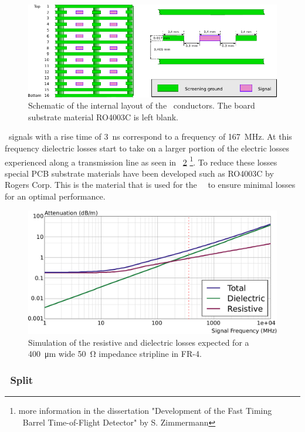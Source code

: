 \documentclass[../BTOF_summary.tex]{subfiles}
\begin{document}
\begin{figure}[htbp]
	\centering
	\includegraphics[width=.9\textwidth]{fig/Railboard3_schematic.pdf}
	\caption{Schematic of the internal layout of the \railboard\ conductors. The board substrate material RO4003C is left blank.}
	\label{fig:Railboard3_schematic}
\end{figure}

\sipm\ signals with a rise time of \SI{3}{ns} correspond to a frequency of \SI{167}{MHz}.
At this frequency dielectric losses start to take on a larger portion of the electric losses experienced along a transmission line as seen in \fig~\ref{fig:LowLossCurve} \footnote{more information in the dissertation "Development of the Fast Timing \panda\ Barrel Time-of-Flight Detector" by S. Zimmermann}.
To reduce these losses special PCB substrate materials have been developed such as RO4003C by Rogers Corp.
This is the material that is used for the \btof\ \railboard\ to ensure minimal losses for an optimal performance.

\begin{figure}
	\centering
	\includegraphics*[width=.8\textwidth]{fig/Loss_Curve_Sebastian_v3.pdf}
	\caption{Simulation of the resistive and dielectric losses expected for a \SI{400}{\micro m} wide \SI{50}{\ohm} impedance stripline in FR-4.}
	\label{fig:LowLossCurve}
\end{figure}

\subsubsection{\railboard\ Split}
\end{document}
